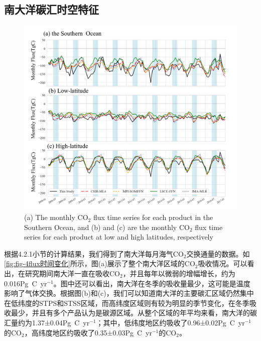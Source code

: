 \subsection{南大洋碳汇时空特征}
\begin{figure}[htb]
    \centering
    \includegraphics[width=\linewidth]{figure/第四章用图/图4-flux时间变化.jpg}
    {(a) The monthly  $\mathrm{CO_2}$ flux time series for each product in the Southern Ocean, and (b) and (c) are the monthly  $\mathrm{CO_2}$ flux time series for each product at low and high latitudes, respectively}
\end{figure}

根据4.2.1小节的计算结果，我们得到了南大洋每月海气$\mathrm{CO_2}$交换通量的数据。如\autoref{fig:fig-4flux时间变化}所示，图(a)展示了整个南大洋区域的$\mathrm{CO_2}$吸收情况。可以看出，在研究期间南大洋一直在吸收$\mathrm{CO_2}$，并且每年以微弱的增幅增长，约为0.016Pg\ C\ yr$^{-1}$。图中还可以看出，南大洋在冬季的吸收量最少，这可能是温度影响了气体交换。根据图(b)和(c)，我们可以知道南大洋的主要碳汇区域仍然集中在低纬度的STPS和STSS区域，而高纬度区域则有较为明显的季节变化，在冬季吸收最少，并且有多个产品认为是碳源区域。从整个区域的年平均来看，南大洋的碳汇量约为1.37±0.04Pg\ C\ yr$^{-1}$；其中，低纬度地区约吸收了0.96±0.02Pg\ C\ yr$^{-1}$的$\mathrm{CO_2}$，高纬度地区约吸收了0.35±0.03Pg\ C\ yr$^{-1}$的$\mathrm{CO_2}$。

